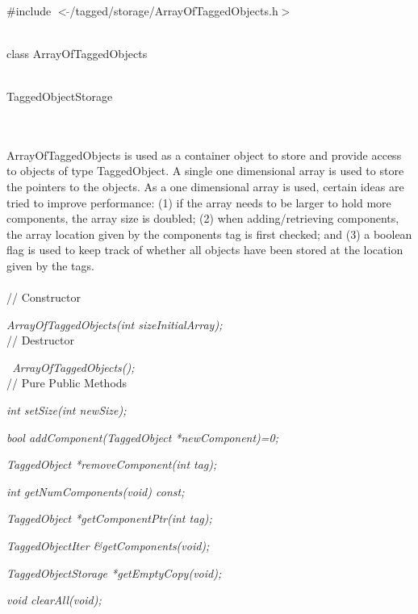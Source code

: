 
   \\
\#include $<\tilde{ }$/tagged/storage/ArrayOfTaggedObjects.h$>$ 


  \\
class ArrayOfTaggedObjects  


 \\
 {TaggedObjectStorage} 

\indent{} \\

  \\
\indent ArrayOfTaggedObjects is used as a container object to store and
provide access to objects of type TaggedObject. A single one dimensional
array is used to store the pointers to the objects. As a one dimensional
array is used, certain ideas are tried to improve performance: (1) if
the array needs to be larger to hold more components, the array size
is doubled; (2) when adding/retrieving components, the array location
given by the components tag is first checked; and (3) a boolean flag is
used to keep track of whether all objects have been stored at the
location given by the tags.\\

  \\
// Constructor  

{\em ArrayOfTaggedObjects(int sizeInitialArray);} \\

// Destructor 

{\em  ~ArrayOfTaggedObjects();} \\  

// Pure Public Methods 

{\em int  setSize(int newSize);}

{\em bool addComponent(TaggedObject *newComponent)=0;}

{\em TaggedObject *removeComponent(int tag);}

{\em int getNumComponents(void) const;}

{\em TaggedObject *getComponentPtr(int tag);}

{\em TaggedObjectIter \&getComponents(void);}

{\em TaggedObjectStorage *getEmptyCopy(void);}

{\em void clearAll(void);}

